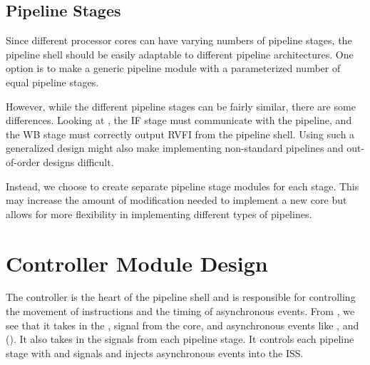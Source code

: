 




\subsection{Pipeline Stages}
Since different processor cores can have varying numbers of pipeline stages, the pipeline shell should be easily adaptable to different pipeline architectures. One option is to make a generic pipeline module with a parameterized number of equal pipeline stages. 

However, while the different pipeline stages can be fairly similar, there are some differences. Looking at , the IF stage must communicate with the pipeline, and the WB stage must correctly output RVFI from the pipeline shell. Using such a generalized design might also make implementing non-standard pipelines and out-of-order designs difficult.

Instead, we choose to create separate pipeline stage modules for each stage. This may increase the amount of modification needed to implement a new core but allows for more flexibility in implementing different types of pipelines.



\section{Controller Module Design}

The controller is the heart of the pipeline shell and is responsible for controlling the movement of instructions and the timing of asynchronous events. From , we see that it takes in the ,  signal from the core, and asynchronous events like , and  (). It also takes in the  signals from each pipeline stage. It controls each pipeline stage with  and  signals and injects asynchronous events into the ISS.

